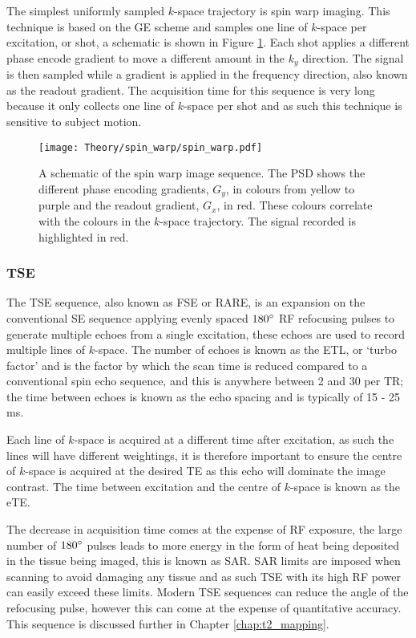 The simplest uniformly sampled $k$-space trajectory is spin warp imaging. This technique is based on the \ac{GE} scheme and samples one line of $k$-space per excitation, or shot, a schematic is shown in Figure \ref{fig:theory_spin_warp}. Each shot applies a different phase encode gradient to move a different amount in the $k_y$ direction. The signal is then sampled while a gradient is applied in the frequency direction, also known as the readout gradient. The acquisition time for this sequence is very long because it only collects one line of $k$-space per shot and as such this technique is sensitive to subject motion.

\begin{figure}[H]
	\centering
	\texttt{[image: Theory/spin\_warp/spin\_warp.pdf]}
	\caption{A schematic of the spin warp image sequence. The \ac*{PSD} shows the different phase encoding gradients, $G_y$, in colours from yellow to purple and the readout gradient, $G_x$, in red. These colours correlate with the colours in the $k$-space trajectory. The signal recorded is highlighted in red.}
	\label{fig:theory_spin_warp}	
\end{figure}

\subsubsection{\ac*{TSE}}
\label{subsubsec:theory_tse}
The \ac{TSE} sequence, also known as \ac{FSE} or \ac{RARE}, is an expansion on the conventional \ac{SE} sequence applying evenly spaced $180\degree${ }\ac{RF} refocusing pulses to generate multiple echoes from a single excitation, these echoes are used to record multiple lines of $k$-space. The number of echoes is known as the \ac{ETL}, or `turbo factor' and is the factor by which the scan time is reduced compared to a conventional spin echo sequence, and this is anywhere between 2 and 30 per \ac{TR}; the time between echoes is known as the echo spacing and is typically of 15 - 25 ms.

Each line of $k$-space is acquired at a different time after excitation, as such the lines will have different \ttwo weightings, it is therefore important to ensure the centre of $k$-space is acquired at the desired \ac{TE} as this echo will dominate the image contrast. The time between excitation and the centre of $k$-space is known as the \ac{eTE}.

The decrease in acquisition time comes at the expense of \ac{RF} exposure, the large number of $180\degree{ }$ pulses leads to more energy in the form of heat being deposited in the tissue being imaged, this is known as \ac{SAR}. \ac{SAR} limits are imposed when scanning to avoid damaging any tissue and as such \ac{TSE} with its high \ac{RF} power can easily exceed these limits. Modern \ac{TSE} sequences can reduce the angle of the refocusing pulse, however this can come at the expense of quantitative accuracy. This sequence is discussed further in Chapter \ref{chap:t2_mapping}.

